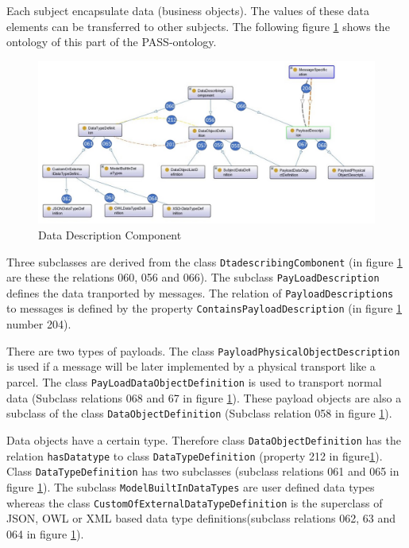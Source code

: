 Each subject encapsulate data (business objects). The values of these data elements can be transferred to other subjects. The following figure \ref{fig:20181218-data} shows the ontology of this part of the PASS-ontology.

\begin{figure}[htbp]
	\centering
	\includegraphics[width=0.9\linewidth]{20181026-Ontologie-Bilder/Grafiken-Ontologie/SUbject-Interaction/20181218-Data}
	\caption[Data Description Component]{Data Description Component}
	\label{fig:20181218-data}
\end{figure}

Three subclasses are derived from the class \texttt{DtadescribingCombonent} (in figure \ref{fig:20181218-data} are these the relations 060, 056 and 066). The subclass \texttt{PayLoadDescription} defines the data tranported by messages. The relation of \texttt{PayloadDescriptions} to messages is defined by the property \texttt{ContainsPayloadDescription} (in figure \ref{fig:20181218-data} number 204).

There are two types of payloads. The class \texttt{PayloadPhysicalObjectDescription} is used if a message will be later implemented by a physical transport like a parcel. The class \texttt{PayLoadDataObjectDefinition} is used to transport normal data (Subclass relations 068 and 67 in figure \ref{fig:20181218-data}). These payload objects are also a subclass of the class \texttt{DataObjectDefinition} (Subclass relation 058 in figure \ref{fig:20181218-data}).

Data objects have a certain type. Therefore class \texttt{DataObjectDefinition} has the relation \texttt{hasDatatype} to class \texttt{DataTypeDefinition} (property 212 in figure\ref{fig:20181218-data}). Class \texttt{DataTypeDefinition} has two subclasses (subclass relations 061 and 065 in figure \ref{fig:20181218-data}). The subclass \texttt{ModelBuiltInDataTypes} are user defined data types whereas the class \texttt{CustomOfExternalDataTypeDefinition} is the superclass of JSON, OWL or XML based data type definitions(subclass relations 062, 63 and 064 in figure \ref{fig:20181218-data}).

